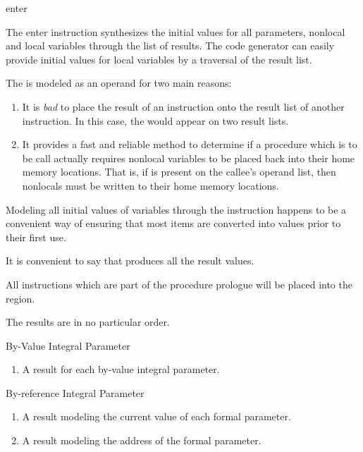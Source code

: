 \begin{instruction}{enter}

  \begin{notes}
    The enter instruction synthesizes the initial values for all
    parameters, nonlocal and local variables through the list of
    results.  The code generator can easily provide initial values for
    local variables by a traversal of the result list.

    The  is modeled as an operand for two main
    reasons:
    \begin{enumerate}
    \item It is \emph{bad} to place the result of an instruction onto
      the result list of another instruction.  In this case, the
       would appear on two result lists.
    \item It provides a fast and reliable method to determine if a
      procedure which is to be call actually requires nonlocal
      variables to be placed back into their home memory locations.
      That is, if  is present on the callee's
       operand list, then nonlocals must be written to
      their home memory locations.
    \end{enumerate}

    Modeling all initial values of variables through the
     instruction happens to be a convenient way of
    ensuring that most  items are converted into
     values prior to their first use.

    It is convenient to say that  produces all the
    result values.

    All instructions which are part of the procedure prologue will be
    placed into the  region.

    The results are in no particular order.
  \end{notes}

  \begin{results}
  \item By-Value Integral Parameter
    \begin{enumerate}
    \item A result for each by-value integral parameter.
    \end{enumerate}

  \item By-reference Integral Parameter
    \begin{enumerate}
    \item A result modeling the current value of each \byref formal
      parameter.
    \item A result modeling the address of the formal parameter.
    \end{enumerate}


\end{results}
\end{instruction}
